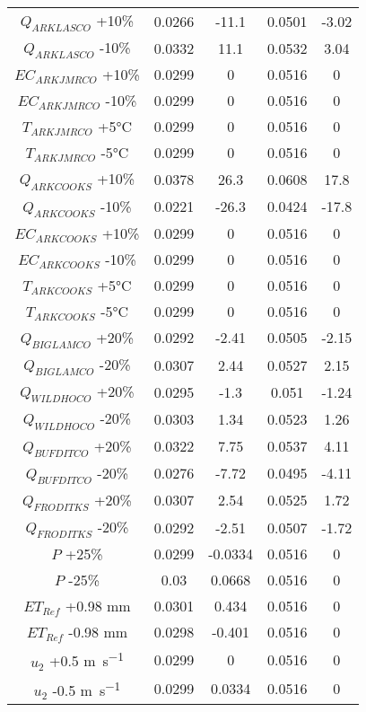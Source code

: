 \begin{linenumbers}
\begin{spacing}{1.0}
\begin{center}
\begin{longtable}{ccccc}
			$Q_{ARKLASCO} $ +10\% & 0.0266 & -11.1 & 0.0501 & -3.02 \\
			$Q_{ARKLASCO} $ -10\% & 0.0332 & 11.1 & 0.0532 & 3.04 \\
			$EC_{ARKJMRCO} $ +10\% & 0.0299 & 0 & 0.0516 & 0 \\
			$EC_{ARKJMRCO} $ -10\% & 0.0299 & 0 & 0.0516 & 0 \\
			$T_{ARKJMRCO} $ +5\si{\degreeCelsius}& 0.0299 & 0 & 0.0516 & 0 \\
			$T_{ARKJMRCO} $ -5\si{\degreeCelsius}& 0.0299 & 0 & 0.0516 & 0 \\
			$Q_{ARKCOOKS} $ +10\% & 0.0378 & 26.3 & 0.0608 & 17.8 \\
			$Q_{ARKCOOKS} $ -10\% & 0.0221 & -26.3 & 0.0424 & -17.8 \\
			$EC_{ARKCOOKS} $ +10\% & 0.0299 & 0 & 0.0516 & 0 \\
			$EC_{ARKCOOKS} $ -10\% & 0.0299 & 0 & 0.0516 & 0 \\
			$T_{ARKCOOKS} $ +5\si{\degreeCelsius}& 0.0299 & 0 & 0.0516 & 0 \\
			$T_{ARKCOOKS} $ -5\si{\degreeCelsius}& 0.0299 & 0 & 0.0516 & 0 \\
			$Q_{BIGLAMCO} $ +20\% & 0.0292 & -2.41 & 0.0505 & -2.15 \\
			$Q_{BIGLAMCO} $ -20\% & 0.0307 & 2.44 & 0.0527 & 2.15 \\
			$Q_{WILDHOCO} $ +20\% & 0.0295 & -1.3 & 0.051 & -1.24 \\
			$Q_{WILDHOCO} $ -20\% & 0.0303 & 1.34 & 0.0523 & 1.26 \\
			$Q_{BUFDITCO} $ +20\% & 0.0322 & 7.75 & 0.0537 & 4.11 \\
			$Q_{BUFDITCO} $ -20\% & 0.0276 & -7.72 & 0.0495 & -4.11 \\
			$Q_{FRODITKS} $ +20\% & 0.0307 & 2.54 & 0.0525 & 1.72 \\
			$Q_{FRODITKS} $ -20\% & 0.0292 & -2.51 & 0.0507 & -1.72 \\
			$P$ +25\% & 0.0299 & -0.0334 & 0.0516 & 0 \\
			$P$ -25\% & 0.03 & 0.0668 & 0.0516 & 0 \\
			$ET_{Ref} $ +0.98 \si{\milli\meter} & 0.0301 & 0.434 & 0.0516 & 0 \\
			$ET_{Ref} $ -0.98 \si{\milli\meter} & 0.0298 & -0.401 & 0.0516 & 0 \\
			$u_{2} $ +0.5 \si{\meter\per\second} & 0.0299 & 0 & 0.0516 & 0 \\
			$u_{2} $ -0.5 \si{\meter\per\second} & 0.0299 & 0.0334 & 0.0516 & 0 \\

\end{longtable}
\end{center}
\end{spacing}
\end{linenumbers}
